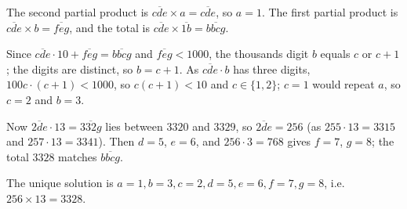 The second partial product is $\overline{cde}\times a=\overline{cde}$, so $a=1$. The first partial product is $\overline{cde}\times b=\overline{feg}$, and the total is $\overline{cde}\times\overline{1b}=\overline{bbcg}$.

Since $\overline{cde}\cdot10+\overline{feg}=\overline{bbcg}$ and $\overline{feg}<1000$, the thousands digit $b$ equals $c$ or $c+1$; the digits are distinct, so $b=c+1$. As $\overline{cde}\cdot b$ has three digits, $100c\cdot(c+1)<1000$, so $c(c+1)<10$ and $c\in\{1,2\}$; $c=1$ would repeat $a$, so $c=2$ and $b=3$.

Now $\overline{2de}\cdot13=\overline{332g}$ lies between $3320$ and $3329$, so $\overline{2de}=256$ (as $255\cdot13=3315$ and $257\cdot13=3341$). Then $d=5$, $e=6$, and $256\cdot3=768$ gives $f=7$, $g=8$; the total $3328$ matches $\overline{bbcg}$.

The unique solution is $\boxed{a=1,b=3,c=2,d=5,e=6,f=7,g=8}$, i.e. $256\times13=3328$.
